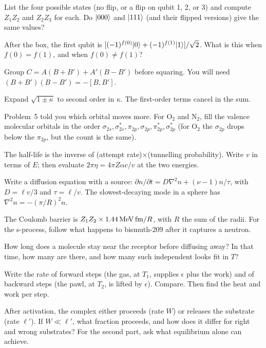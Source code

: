 
 List the four possible states (no flip, or a flip on qubit 1, 2, or 3) and compute $Z_1Z_2$ and $Z_2Z_3$ for each. Do $\lvert 000\rangle$ and $\lvert 111\rangle$ (and their flipped versions) give the same values?

 After the box, the first qubit is $[(-1)^{f(0)}\lvert 0\rangle + (-1)^{f(1)}\lvert 1\rangle]/\sqrt2$. What is this when $f(0) = f(1)$, and when $f(0)\ne f(1)$?

 Group $C = A(B+B') + A'(B-B')$ before squaring. You will need $(B+B')(B-B') = -[B,B']$.


 Expand $\sqrt{1\pm\kappa}$ to second order in $\kappa$. The first-order terms cancel in the sum.

 Problem~5 told you which orbital moves more. For O$_2$ and N$_2$, fill the valence molecular orbitals in the order $\sigma_{2s},\sigma_{2s}^*,\pi_{2p},\sigma_{2p},\pi_{2p}^*,\sigma_{2p}^*$ (for O$_2$ the $\sigma_{2p}$ drops below the $\pi_{2p}$, but the count is the same).


 The half-life is the inverse of (attempt rate)$\times$(tunnelling probability). Write $v$ in terms of $E$; then evaluate $2\pi\eta = 4\pi Z\alpha c/v$ at the two energies.

 Write a diffusion equation with a source: $\partial n/\partial t = D\nabla^2n + (\nu-1)n/\tau$, with $D = \ell v/3$ and $\tau = \ell/v$. The slowest-decaying mode in a sphere has $\nabla^2n = -(\pi/R)^2n$.

 The Coulomb barrier is $Z_1Z_2\times1.44\,\mathrm{MeV\,fm}/R$, with $R$ the sum of the radii. For the s-process, follow what happens to bismuth-209 after it captures a neutron.


 How long does a molecule stay near the receptor before diffusing away? In that time, how many are there, and how many such independent looks fit in $T$?

 Write the rate of forward steps (the gas, at $T_1$, supplies $\epsilon$ plus the work) and of backward steps (the pawl, at $T_2$, is lifted by $\epsilon$). Compare. Then find the heat and work per step.

 After activation, the complex either proceeds (rate $W$) or releases the substrate (rate $\ell'$). If $W\ll\ell'$, what fraction proceeds, and how does it differ for right and wrong substrates? For the second part, ask what equilibrium alone can achieve.

